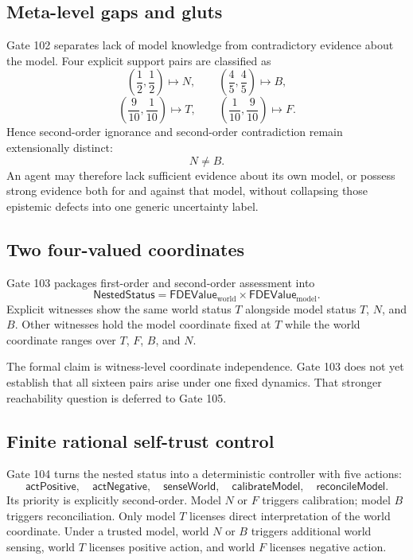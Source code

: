 \subsection{Meta-level gaps and gluts}

Gate 102 separates lack of model knowledge from contradictory evidence about the model. Four explicit support pairs are classified as
\[
\left(\frac12,\frac12\right)\mapsto N,
\qquad
\left(\frac45,\frac45\right)\mapsto B,
\]
\[
\left(\frac9{10},\frac1{10}\right)\mapsto T,
\qquad
\left(\frac1{10},\frac9{10}\right)\mapsto F.
\]
Hence second-order ignorance and second-order contradiction remain extensionally distinct:
\[
N\neq B.
\]
An agent may therefore lack sufficient evidence about its own model, or possess strong evidence both for and against that model, without collapsing those epistemic defects into one generic uncertainty label.

\subsection{Two four-valued coordinates}

Gate 103 packages first-order and second-order assessment into
\[
\mathsf{NestedStatus}
=
\mathsf{FDEValue}_{\mathrm{world}}
\times
\mathsf{FDEValue}_{\mathrm{model}}.
\]
Explicit witnesses show the same world status $T$ alongside model status $T$, $N$, and $B$. Other witnesses hold the model coordinate fixed at $T$ while the world coordinate ranges over $T$, $F$, $B$, and $N$.

The formal claim is witness-level coordinate independence. Gate 103 does not yet establish that all sixteen pairs arise under one fixed dynamics. That stronger reachability question is deferred to Gate 105.

\subsection{Finite rational self-trust control}

Gate 104 turns the nested status into a deterministic controller with five actions:
\[
\mathsf{actPositive},\quad
\mathsf{actNegative},\quad
\mathsf{senseWorld},\quad
\mathsf{calibrateModel},\quad
\mathsf{reconcileModel}.
\]
Its priority is explicitly second-order. Model $N$ or $F$ triggers calibration; model $B$ triggers reconciliation. Only model $T$ licenses direct interpretation of the world coordinate. Under a trusted model, world $N$ or $B$ triggers additional world sensing, world $T$ licenses positive action, and world $F$ licenses negative action.

